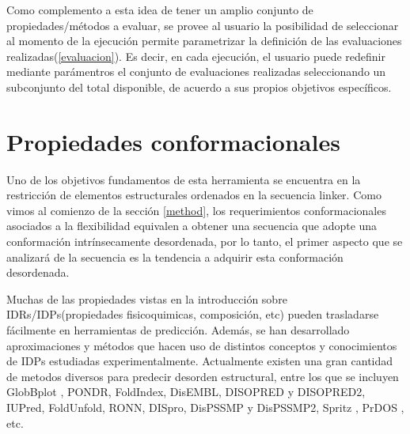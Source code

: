 Como complemento a esta idea de tener un amplio conjunto de propiedades/métodos a evaluar, se provee al usuario la posibilidad de seleccionar al momento de la ejecución 
permite parametrizar la definición de las evaluaciones realizadas(\ref{evaluacion}). 
Es decir, en cada ejecución, el usuario puede redefinir mediante parámentros el conjunto de evaluaciones realizadas seleccionando un subconjunto del total disponible, de acuerdo a sus propios objetivos específicos.


\section{Propiedades conformacionales} \label{propiedadesConformacionales}

Uno de los objetivos fundamentos de esta herramienta se encuentra en la restricción de elementos estructurales ordenados en la secuencia linker.
Como vimos al comienzo de la sección \ref{method}, los requerimientos conformacionales asociados a la flexibilidad equivalen a obtener una secuencia 
que adopte una conformación intrínsecamente desordenada, por lo tanto, el primer aspecto que se analizará de la secuencia es la tendencia a adquirir esta conformación desordenada.


Muchas de las propiedades vistas en la introducción sobre IDRs/IDPs(propiedades fisicoquimicas, composición, etc) pueden trasladarse fácilmente en herramientas de predicción.
Además, se han desarrollado aproximaciones y métodos que hacen uso de distintos conceptos y conocimientos de IDPs estudiadas experimentalmente.
Actualmente existen una gran cantidad de metodos diversos para predecir desorden estructural\cite{he2009predicting}, entre los que se incluyen
GlobBplot \cite{linding2003globplot}, PONDR, FoldIndex, DisEMBL, DISOPRED y DISOPRED2, IUPred, 
FoldUnfold, RONN, DISpro, DisPSSMP y DisPSSMP2, Spritz , PrDOS , etc.

